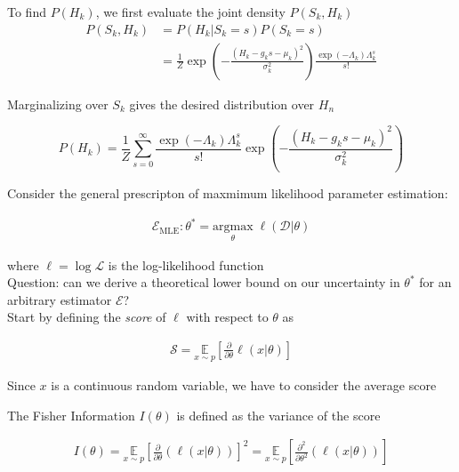 \documentclass{article}
\begin{document}
To find $P(H_{k})$, we first evaluate the joint density $P(S_{k},H_{k})$
\vspace{0.1in}
\begin{align*}
P(S_{k},H_{k}) &= P(H_{k}|S_{k}=s)P(S_{k}=s)\\
&= \frac{1}{Z}\exp\left(-\frac{(H_{k}-g_{k}s-\mu_{k})^{2}}{\sigma_{k}^{2}}\right)\frac{\exp\left({-\Lambda_{k}}\right)\Lambda_{k}^{s}}{s!}
\end{align*}
\vspace{0.1in}

Marginalizing over $S_{k}$ gives the desired distribution over $H_{n}$

\begin{equation*}
P(H_{k}) = \frac{1}{Z}\sum_{s=0}^{\infty}\frac{\exp\left({-\Lambda_{k}}\right)\Lambda_{k}^{s}}{s!}\exp\left(-\frac{(H_{k}-g_{k}s-\mu_{k})^{2}}{\sigma_{k}^{2}}\right)
\end{equation*}



Consider the general prescripton of maxmimum likelihood parameter estimation:

\begin{align*}
\mathcal{E}_{\mathrm{MLE}}: \theta^{*} = \underset{\theta}{\mathrm{argmax}}\; \ell(\mathcal{D}|\theta)
\end{align*}

where $\ell = \log\mathcal{L}$ is the log-likelihood function\\
\vspace{0.1in}
Question: can we derive a theoretical lower bound on our uncertainty in $\theta^{*}$ for an arbitrary estimator $\mathcal{E}$?\\
\vspace{0.1in}
Start by defining the \emph{score} of $\ell$ with respect to $\theta$ as

\begin{align*}
\mathcal{S} = \underset{{x\sim p}}{\mathbb{E}}\left[\frac{\partial}{\partial\theta} \ell(x|\theta)\right]
\end{align*}

Since $x$ is a continuous random variable, we have to consider the average score


The Fisher Information $I(\theta)$ is defined as the variance of the score

\begin{align*}
I(\theta) = \underset{{x\sim p}}{\mathbb{E}}\left[\frac{\partial}{\partial\theta} \left(\ell(x|\theta)\right)\right]^{2} = \underset{{x\sim p}}{\mathbb{E}}\left[\frac{\partial^{2}}{\partial\theta^{2}} \left(\ell(x|\theta)\right)\right]
\end{align*}
\end{document}

